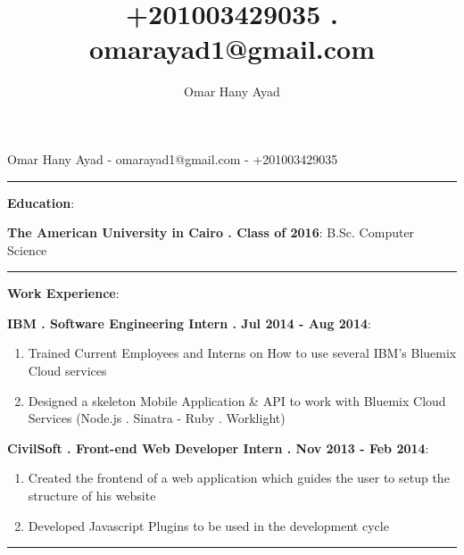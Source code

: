 \documentclass[24pt]{article}
\title{+201003429035 . omarayad1@gmail.com}
\author{Omar Hany Ayad}
\begin{document}
\begin{center}
{\Large Omar Hany Ayad - omarayad1@gmail.com - +201003429035}
\end{center}

\noindent\rule{18cm}{0.4pt}

{\large \textbf{Education}}:

\textbf{The American University in Cairo . Class of 2016}: B.Sc. Computer Science

\noindent\rule{18cm}{0.4pt}

{\large \textbf{Work Experience}}:
	
\textbf{IBM . Software Engineering Intern . Jul 2014 - Aug 2014}:
\begin{enumerate}
	\item Trained Current Employees and Interns on How to use several IBM's Bluemix Cloud services
	\item Designed a skeleton Mobile Application \& API to work with Bluemix Cloud Services (Node.js . Sinatra - Ruby . Worklight)
\end{enumerate}
																																																																																																																																																																																																																																																																																															
\textbf{CivilSoft . Front-end Web Developer Intern . Nov 2013 - Feb 2014}:
\begin{enumerate}
	\item Created the frontend of a web application which guides the user to setup the structure of his website
	\item Developed Javascript Plugins to be used in the development cycle
\end{enumerate}
\noindent\rule{18cm}{0.4pt}
\end{document}
